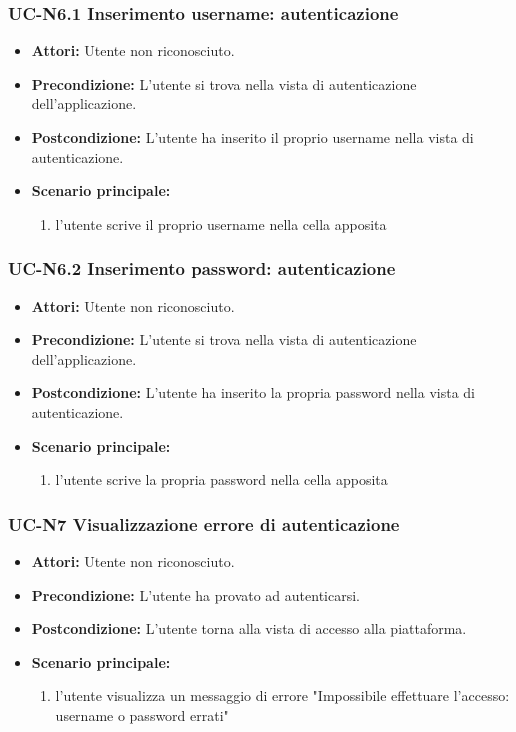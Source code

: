 \subsubsection{UC-N6.1 Inserimento username: autenticazione}
\begin{itemize}
	\item \textbf{Attori:} Utente non riconosciuto.
			\item \textbf{Precondizione:} L'utente si trova nella vista di autenticazione dell'applicazione.
			\item \textbf{Postcondizione:} L'utente ha inserito il proprio username nella vista di autenticazione.
			\item \textbf{Scenario principale:}
				\begin{enumerate}
					\item l'utente scrive il proprio username nella cella apposita
				\end{enumerate}
\end{itemize}

\subsubsection{UC-N6.2 Inserimento password: autenticazione}
\begin{itemize}
	\item \textbf{Attori:} Utente non riconosciuto.
			\item \textbf{Precondizione:} L'utente si trova nella vista di autenticazione dell'applicazione.
			\item \textbf{Postcondizione:} L'utente ha inserito la propria password nella vista di autenticazione.
			\item \textbf{Scenario principale:}
				\begin{enumerate}
					\item l'utente scrive la propria password nella cella apposita
				\end{enumerate}
\end{itemize}
		
\subsubsection{UC-N7 Visualizzazione errore di autenticazione}
		\begin{itemize}
			\item \textbf{Attori:} Utente non riconosciuto.
			\item \textbf{Precondizione:} L'utente ha provato ad autenticarsi.
			\item \textbf{Postcondizione:} L'utente torna alla vista di accesso alla piattaforma.
			\item \textbf{Scenario principale:}
			\begin{enumerate}
				\item l'utente visualizza un messaggio di errore "Impossibile effettuare l'accesso: username o password errati"
			\end{enumerate}
		\end{itemize}
		
